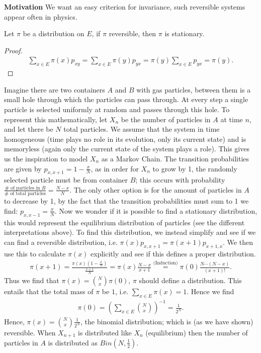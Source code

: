 \textbf{Motivation} We want an easy criterion for invariance, such reversible systems appear often in physics.

\begin{prop}[]
	Let $\pi $ be a distribution on $E$, if $\pi $ reversible, then $\pi $ is stationary.
\end{prop}
\begin{proof}
	\begin{align}
		\sum_{x \in E}^{} \pi (x)p_{xy} = \sum_{x \in E}^{} \pi (y) p_{yx} = \pi (y) \sum_{x \in E}^{} p_{yx} = \pi(y) 
	.\end{align}	
\end{proof}

\begin{ex}
	Imagine there are two containers $A$ and $B$ with gas particles, between them is a small hole through which the particles can pass through. At every step a single particle is selected uniformly at random and passes through this hole. To represent this mathematically, let $X_n$ be the number of particles in $A$ at time $n$, and let there be $N$ total particles. We assume that the system in time homogeneous (time plays no role in its evolution, only its current state) and is memoryless (again only the current state of the system plays a role). This gives us the inspiration to model $X_n$ as a Markov Chain. The transition probabilities are given by $p_{x, x+1}= 1- \frac{x}{N}$, as in order for $X_n$ to grow by 1, the randomly selected particle must be from container $B $; this occurs with probability $\frac{\# \textrm{ of particles in }B}{\# \textrm{ of total particles}} = \frac{N-x}{N}$. The only other option is for the amount of particles in $A$ to decrease by 1, by the fact that the transition probabilities must sum to 1 we find: $p_{x, x-1}= \frac{x}{N}$. Now we wonder if it is possible to find a stationary distribution, this would represent the equilibrium distribution of particles (see the different interpretations above). To find this distribution, we instead simplify and see if we can find a reversible distribution, i.e. $\pi (x) p_{x,x+1} = \pi (x+1)p_{x+1, x}$. We then use this to calculate $\pi (x)$ explicitly and see if this defines a proper distribution. 
	\begin{align}
		\pi (x+1) = \frac{\pi (x)(1 - \frac{x}{N})}{\frac{x+1}{N}} = \pi (x) \frac{N-x}{x+1} \stackrel{\textrm{(Induction)}}{=} \pi (0) \frac{N  \cdots (N-x)}{(x+1)!} 
	.\end{align}	
	Thus we find that $\pi (x) = \binom{N}{x}\pi(0)$, $\pi$ should define a distribution. This entails that the total mass of $\pi $ be $1$, i.e. $\sum_{x \in E}^{} \pi (x)=1$. Hence we find 
\begin{align}
\pi (0) = \left( \sum_{x \in E}^{} \binom{N}{x} \right)^{-1} = \frac{1}{2^N} 
.\end{align}
Hence, $\pi (x)= \binom{N}{x} \frac{1}{2^N}$, the binomial distribution; which is (as we have shown) reversible. When $X_{n+1}$ is distributed like $X_n$ (equilibrium) then the number of particles in $A$ is distributed as $Bin(N, \frac{1}{2})$.
\end{ex}


